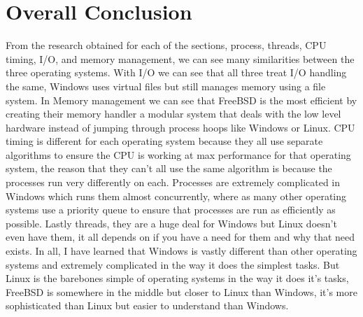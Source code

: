 \documentclass[onecolumn, draftclsnofoot,10pt, compsoc]{IEEEtran}
\begin{document}
\section{Overall Conclusion}
From the research obtained for each of the sections, process, threads, CPU timing, I/O, and memory management, we can see many similarities between the three operating systems. With I/O we can see that all three treat I/O handling the same, Windows uses virtual files but still manages memory using a file system. In Memory management we can see that FreeBSD is the most efficient by creating their memory handler a modular system that deals with the low level hardware instead of jumping through process hoops like Windows or Linux. CPU timing is different for each operating system because they all use separate algorithms to ensure the CPU is working at max performance for that operating system, the reason that they can't all use the same algorithm is because the processes run very differently on each.  Processes are extremely complicated in Windows which runs them almost concurrently, where as many other operating systems use a priority queue to ensure that processes are run as efficiently as possible. Lastly threads, they are a huge deal for Windows but Linux doesn't even have them, it all depends on if you have a need for them and why that need exists. In all, I have learned that Windows is vastly different than other operating systems and extremely complicated in the way it does the simplest tasks. But Linux is the barebones simple of operating systems in the way it does it's tasks, FreeBSD is somewhere in the middle but closer to Linux than Windows, it's more sophisticated than Linux but easier to understand than Windows.




\end{document}
